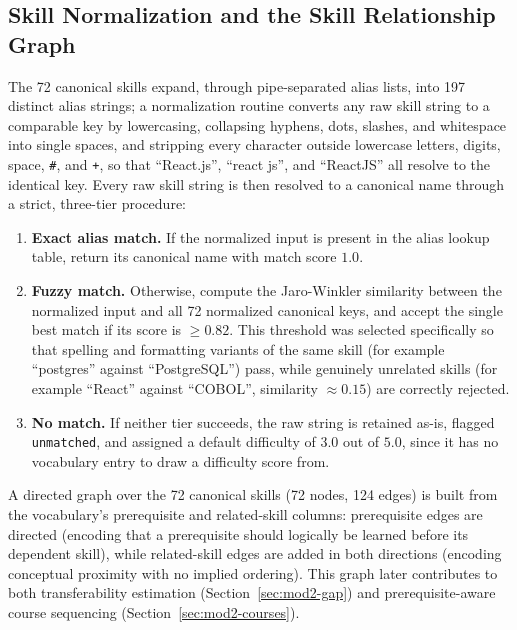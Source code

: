 \documentclass[11pt,a4paper]{article}
\newcommand{\code}[1]{\texttt{\footnotesize #1}}
\begin{document}
\subsection{Skill Normalization and the Skill Relationship Graph}
\label{sec:mod2-normalization}

The 72 canonical skills expand, through pipe-separated alias lists, into 197 distinct alias strings; a normalization routine converts any raw skill string to a comparable key by lowercasing, collapsing hyphens, dots, slashes, and whitespace into single spaces, and stripping every character outside lowercase letters, digits, space, \texttt{\#}, and \texttt{+}, so that ``React.js'', ``react js'', and ``ReactJS'' all resolve to the identical key. Every raw skill string is then resolved to a canonical name through a strict, three-tier procedure:

\begin{enumerate}[leftmargin=1.4cm]
  \item \textbf{Exact alias match.} If the normalized input is present in the alias lookup table, return its canonical name with match score $1.0$.
  \item \textbf{Fuzzy match.} Otherwise, compute the Jaro-Winkler similarity between the normalized input and all 72 normalized canonical keys, and accept the single best match if its score is $\geq 0.82$. This threshold was selected specifically so that spelling and formatting variants of the same skill (for example ``postgres'' against ``PostgreSQL'') pass, while genuinely unrelated skills (for example ``React'' against ``COBOL'', similarity $\approx 0.15$) are correctly rejected.
  \item \textbf{No match.} If neither tier succeeds, the raw string is retained as-is, flagged \code{unmatched}, and assigned a default difficulty of $3.0$ out of $5.0$, since it has no vocabulary entry to draw a difficulty score from.
\end{enumerate}

A directed graph over the 72 canonical skills (72 nodes, 124 edges) is built from the vocabulary's prerequisite and related-skill columns: prerequisite edges are directed (encoding that a prerequisite should logically be learned before its dependent skill), while related-skill edges are added in both directions (encoding conceptual proximity with no implied ordering). This graph later contributes to both transferability estimation (Section~\ref{sec:mod2-gap}) and prerequisite-aware course sequencing (Section~\ref{sec:mod2-courses}).
\end{document}
